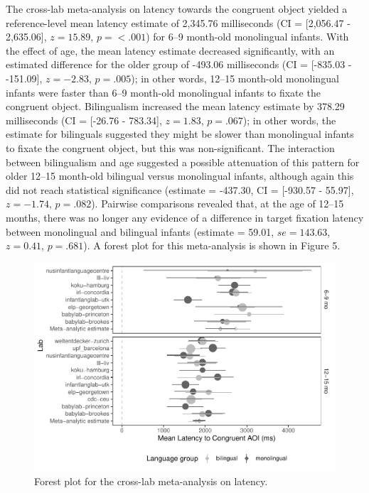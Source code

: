 \documentclass[,man,floatsintext]{apa6}
\begin{document}
The cross-lab meta-analysis on latency towards the congruent object yielded a reference-level mean latency estimate of 2,345.76 milliseconds (CI = {[}2,056.47 - 2,635.06{]}, \(z = 15.89\), \(p = < .001\)) for 6--9 month-old monolingual infants. With the effect of age, the mean latency estimate decreased significantly, with an estimated difference for the older group of -493.06 milliseconds (CI = {[}-835.03 - -151.09{]}, \(z = -2.83\), \(p = .005\)); in other words, 12--15 month-old monolingual infants were faster than 6--9 month-old monolingual infants to fixate the congruent object. Bilingualism increased the mean latency estimate by 378.29 milliseconds (CI = {[}-26.76 - 783.34{]}, \(z = 1.83\), \(p = .067\)); in other words, the estimate for bilinguals suggested they might be slower than monolingual infants to fixate the congruent object, but this was non-significant. The interaction between bilingualism and age suggested a possible attenuation of this pattern for older 12--15 month-old bilingual versus monolingual infants, although again this did not reach statistical significance (estimate = -437.30, CI = {[}-930.57 - 55.97{]}, \(z = -1.74\), \(p = .082\)). Pairwise comparisons revealed that, at the age of 12--15 months, there was no longer any evidence of a difference in target fixation latency between monolingual and bilingual infants (estimate = 59.01, \(se = 143.63\), \(z = 0.41\), \(p = .681\)). A forest plot for this meta-analysis is shown in Figure 5.

\begin{figure}
\centering
\includegraphics{gaze-following-paper_blinded_files/figure-latex/fig5-1.pdf}
\caption{\label{fig:fig5}Forest plot for the cross-lab meta-analysis on latency.}
\end{figure}
\end{document}
